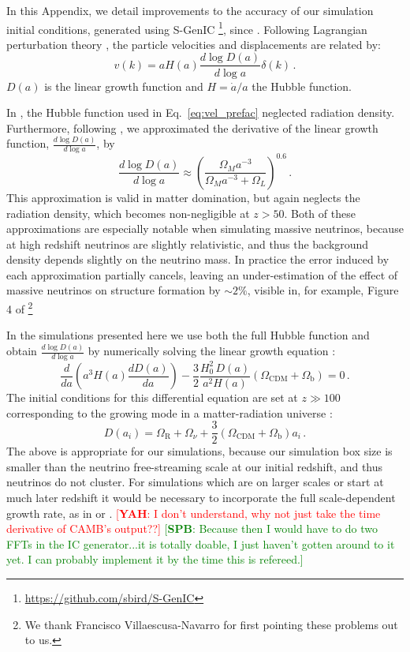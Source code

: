 \documentclass[useAMS, usenatbib]{mnras}
\newcommand{\spb}[1]{{\textcolor{green}{[{\bf SPB}: #1]}}}
\newcommand{\yah}[1]{{\textcolor{red}{[{\bf YAH}: #1]}}}
\begin{document}
In this Appendix, we detail improvements to the accuracy of our simulation initial conditions, generated using S-GenIC \footnote{\url{https://github.com/sbird/S-GenIC}}, since \cite{AHB}.
Following Lagrangian perturbation theory \citep{Zeldovich_1970, Scoccimarro_1998},
the particle velocities and displacements are related by:
\begin{equation}
v(k) = a H(a) \frac{d \log D(a)}{d \log a} \delta(k)\,.
\label{eq:vel_prefac}
\end{equation}
$D(a)$ is the linear growth function and $H = \dot{a}/a$ the Hubble function.

In \cite{AHB}, the Hubble function used in Eq.~\ref{eq:vel_prefac}
neglected radiation density. Furthermore, following \cite{Bouchet:1995}, we
approximated the derivative of the linear growth function, $\frac{d \log D(a)}{d \log a}$, by
\begin{equation}
\frac{d \log D(a)}{d \log a} \approx \left(\frac{\Omega_M a^{-3}}{\Omega_M  a^{-3} + \Omega_L}\right)^{0.6}\,.
\end{equation}
This approximation is valid in matter domination, but again neglects the radiation density,
which becomes non-negligible at $z > 50$. Both of these approximations are especially notable
when simulating massive neutrinos, because at high redshift neutrinos are slightly relativistic,
and thus the background density depends slightly on the neutrino mass. In practice the error
induced by each approximation partially cancels, leaving an under-estimation of the effect of
massive neutrinos on structure formation by $\sim 2 \%$, visible in, for example,
Figure 4 of \cite{AHB}\footnote{We thank Francisco Villaescusa-Navarro for first pointing these problems out to us.}

In the simulations presented here we use both the full Hubble function
and obtain $\frac{d \log D(a)}{d \log a}$ by numerically solving
the linear growth equation \citep{Peebles:1993}:
\begin{equation}
\frac{d}{da}\left(a^3 H(a) \frac{d D(a)}{da}\right) - \frac{3}{2} \frac{H_0^2\,D(a)}{a^2 H(a)} \left(\Omega_\mathrm{CDM} + \Omega_\mathrm{b}\right)= 0\,.
\end{equation}
The initial conditions for this differential equation are set at $z \gg 100$ corresponding
to the growing mode in a matter-radiation universe \citep{Groth:1975}:
\begin{equation}
  D(a_i) = \Omega_\mathrm{R} + \Omega_\nu + \frac{3}{2} \left(\Omega_\mathrm{CDM} + \Omega_\mathrm{b}\right) a_i\,.
\end{equation}
The above is appropriate for our simulations, because our simulation box size is smaller than the neutrino free-streaming scale at our initial redshift, and thus neutrinos do not cluster. For simulations which are on larger scales or start at much later redshift it would be necessary to incorporate the full scale-dependent growth rate, as in \cite{Zennaro_2017} or \cite{OLeary_2012}. \yah{I don't understand, why not just take the time derivative of CAMB's output??} \spb{Because then I would have to do two FFTs in the IC generator...it is totally doable, I just haven't gotten around to it yet. I can probably implement it by the time this is refereed.}
\end{document}
